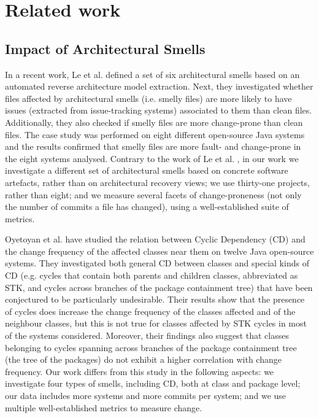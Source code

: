 \section{Related work}\label{c5:sec:related-work}
\subsection{Impact of Architectural Smells}
In a recent work, Le et al. \cite{Le2018} defined a set of six architectural smells based on an automated reverse architecture model extraction. Next, they investigated whether files affected by architectural smells (i.e. smelly files) are more likely to have issues (extracted from issue-tracking systems) associated to them than clean files.
Additionally, they also checked if smelly files are more change-prone than clean files.
The case study was performed on eight different open-source Java systems and the results confirmed that smelly files are more fault- and change-prone in the eight systems analysed. 
Contrary to the work of Le et al. \cite{Le2018}, in our work we investigate a different set of architectural smells based on concrete software artefacts, rather than on architectural recovery views; we use thirty-one projects, rather than eight; and we measure several facets of change-proneness (not only the number of commits a file has changed), using a well-established suite of metrics. 

Oyetoyan et al. \cite{Oyetoyan2015} have studied the relation between Cyclic Dependency (CD) and the change frequency of the affected classes near them on twelve Java open-source systems.
They investigated both general CD between classes and special kinds of CD (e.g. cycles that contain both parents and children classes, abbreviated as STK, and cycles across branches of the package containment tree) that have been conjectured to be particularly undesirable.
Their results show that the presence of cycles does increase the change frequency of the classes affected and of the neighbour classes, but this is not true for classes affected by STK cycles in most of the systems considered.
Moreover, their findings also suggest that classes belonging to cycles spanning across branches of the package containment tree (the tree of the packages) do not exhibit a higher correlation with change frequency.
Our work differs from this study in the following aspects: we investigate four types of smells, including CD, both at class and package level; our data includes more systems and more commits per system; and we use multiple well-established metrics to measure change.

